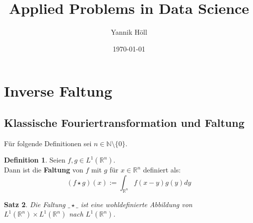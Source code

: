 \documentclass{article}
\title{Applied Problems in Data Science}
\author{Yannik Höll}
\date{\today}
\newcommand{\R}[0]{\mathbb{R}}
\theoremstyle{plain}
\newtheorem{thm}{Satz}[section]
\theoremstyle{definition}
\newtheorem{defin}[thm]{Definition}
\begin{document}
\nocite{*}

\maketitle

\section{Inverse Faltung}

\subsection{Klassische Fouriertransformation und Faltung}

Für folgende Definitionen sei $n \in \mathbb{N} \setminus \{ 0 \}$.

\begin{defin}
    Seien $f,g \in L^1(\R^n)$. \\
    Dann ist die \textbf{Faltung} von $f$ mit $g$ für $x \in \R^n$ definiert als:
    \begin{equation}
        (f \star g)(x) := \int_{\R^n} f(x - y) g(y) dy
    \end{equation}
\end{defin}

\begin{thm}\label{thm:konvmap}
    Die Faltung $\_ \star \_$ ist eine wohldefinierte Abbildung von $L^1(\R^n) \times L^1(\R^n)$ nach $L^1(\R^n)$.
\end{thm}
\end{document}
